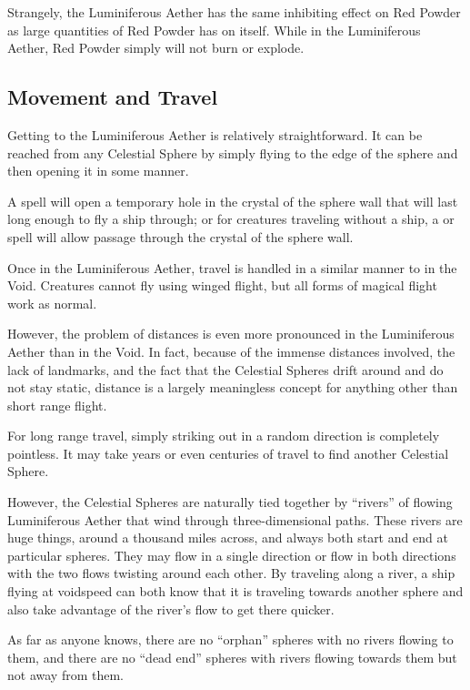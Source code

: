 \begin{multicols*}{2}
Strangely, the Luminiferous Aether has the same inhibiting effect on Red Powder as large quantities of Red Powder has on itself. While in the Luminiferous Aether, Red Powder simply will not burn or explode.

\subsection{Movement and Travel}
Getting to the Luminiferous Aether is relatively straightforward. It can be reached from any Celestial Sphere by simply flying to the edge of the sphere and then opening it in some manner.

A  spell will open a temporary hole in the crystal of the sphere wall that will last long enough to fly a ship through; or for creatures traveling without a ship, a  or  spell will allow passage through the crystal of the sphere wall.

Once in the Luminiferous Aether, travel is handled in a similar manner to in the Void. Creatures cannot fly using winged flight, but all forms of magical flight work as normal.

However, the problem of distances is even more pronounced in the Luminiferous Aether than in the Void. In fact, because of the immense distances involved, the lack of landmarks, and the fact that the Celestial Spheres drift around and do not stay static, distance is a largely meaningless concept for anything other than short range flight.

For long range travel, simply striking out in a random direction is completely pointless. It may take years or even centuries of travel to find another Celestial Sphere.

However, the Celestial Spheres are naturally tied together by “rivers” of flowing Luminiferous Aether that wind through three-dimensional paths. These rivers are huge things, around a thousand miles across, and always both start and end at particular spheres. They may flow in a single direction or flow in both directions with the two flows twisting around each other. By traveling along a river, a ship flying at voidspeed can both know that it is traveling towards another sphere and also take advantage of the river’s flow to get there quicker.

As far as anyone knows, there are no “orphan” spheres with no rivers flowing to them, and there are no “dead end” spheres with rivers flowing towards them but not away from them.


\end{multicols*}
